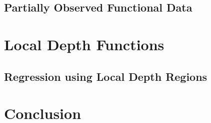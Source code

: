 \documentclass[12pt]{report}
\begin{document}
        \section{Partially Observed Functional Data}


    \chapter{Local Depth Functions}
        \section{Regression using Local Depth Regions}



    \chapter{Conclusion}
    


    \nocite{*}
    \printbibliography

    \appendix
\end{document}

